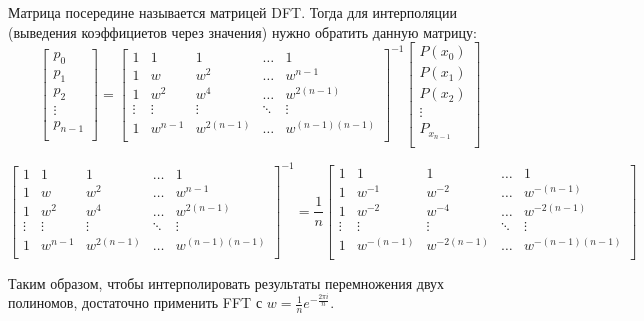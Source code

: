 \documentclass{article}
\begin{document}
  Матрица посередине называется матрицей DFT. Тогда для интерполяции (выведения коэффициетов через значения) нужно обратить данную матрицу:
  \[
  \begin{bmatrix}
  p_0\\
  p_1\\
  p_2\\
  \vdots\\
  p_{n-1}\\
  \end{bmatrix}
  = 
  \begin{bmatrix}
  1&1&1&\hdots&1\\
  1&w&w^2&\hdots&w^{n-1}\\
  1&w^2&w^4&\hdots&w^{2(n-1)}\\
  \vdots&\vdots&\vdots&\ddots&\vdots\\
  1&w^{n-1}&w^{2(n-1)}&\hdots&w^{(n-1)(n-1)}\\
  \end{bmatrix}^{-1}
  \begin{bmatrix}
  P(x_0)\\
  P(x_1)\\
  P(x_2)\\
  \vdots\\
  P_{x_{n-1}}\\
  \end{bmatrix}\]
  \begin{lemma}
    \[\begin{bmatrix}
  1&1&1&\hdots&1\\
  1&w&w^2&\hdots&w^{n-1}\\
  1&w^2&w^4&\hdots&w^{2(n-1)}\\
  \vdots&\vdots&\vdots&\ddots&\vdots\\
  1&w^{n-1}&w^{2(n-1)}&\hdots&w^{(n-1)(n-1)}\\
    \end{bmatrix}^{-1}
    =
    \frac{1}{n}
    \begin{bmatrix}
  1&1&1&\hdots&1\\
  1&w^{-1}&w^{-2}&\hdots&w^{-(n-1)}\\
  1&w^{-2}&w^{-4}&\hdots&w^{-2(n-1)}\\
  \vdots&\vdots&\vdots&\ddots&\vdots\\
  1&w^{-(n-1)}&w^{-2(n-1)}&\hdots&w^{-(n-1)(n-1)}\\
  \end{bmatrix}\]
  \end{lemma}

  Таким образом, чтобы интерполировать результаты перемножения двух полиномов, достаточно применить FFT с $w= \frac{1}{n}e^{-\frac{2\pi i}{n}}$.
\end{document}

